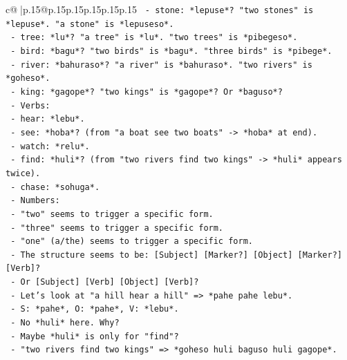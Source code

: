 \documentclass{article}
\begin{document}
{\begin{supertabular}{c@{$\;$}|p{.15\linewidth}@{}p{.15\linewidth}p{.15\linewidth}p{.15\linewidth}p{.15\linewidth}p{.15\linewidth}}
{{{\texttt{                    {-} stone: *lepuse*? "two stones" is *lepuse*. "a stone" is *lepuseso*.} \\
\texttt{                    {-} tree: *lu*? "a tree" is *lu*. "two trees" is *pibegeso*.} \\
\texttt{                    {-} bird: *bagu*? "two birds" is *bagu*. "three birds" is *pibege*.} \\
\texttt{                    {-} river: *bahuraso*? "a river" is *bahuraso*. "two rivers" is *goheso*.} \\
\texttt{                    {-} king: *gagope*? "two kings" is *gagope*? Or *baguso*?} \\
\texttt{                  {-} Verbs:} \\
\texttt{                    {-} hear: *lebu*.} \\
\texttt{                    {-} see: *hoba*? (from "a boat see two boats" {-}> *hoba* at end).} \\
\texttt{                    {-} watch: *relu*.} \\
\texttt{                    {-} find: *huli*? (from "two rivers find two kings" {-}> *huli* appears twice).} \\
\texttt{                    {-} chase: *sohuga*.} \\
\texttt{                  {-} Numbers:} \\
\texttt{                    {-} "two" seems to trigger a specific form.} \\
\texttt{                    {-} "three" seems to trigger a specific form.} \\
\texttt{                    {-} "one" (a/the) seems to trigger a specific form.} \\
\texttt{                  {-} The structure seems to be: {[}Subject{]} {[}Marker?{]} {[}Object{]} {[}Marker?{]} {[}Verb{]}?} \\
\texttt{                  {-} Or {[}Subject{]} {[}Verb{]} {[}Object{]} {[}Verb{]}?} \\
\texttt{                  {-} Let's look at "a hill hear a hill" => *pahe pahe lebu*.} \\
\texttt{                    {-} S: *pahe*, O: *pahe*, V: *lebu*.} \\
\texttt{                    {-} No *huli* here. Why?} \\
\texttt{                    {-} Maybe *huli* is only for "find"?} \\
\texttt{                    {-} "two rivers find two kings" => *goheso huli baguso huli gagope*.} \\
}}}
\end{supertabular}}
\end{document}
